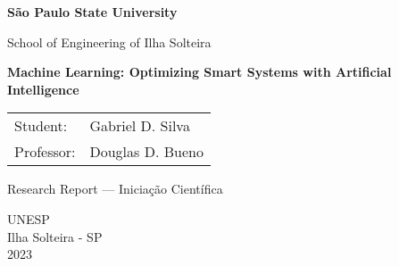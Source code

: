 \begin{titlepage}
    
\sffamily
\centering
{\Large\bfseries São Paulo State University}

{\Large School of Engineering of Ilha Solteira}

\vfill

{\LARGE\bfseries Machine Learning: Optimizing Smart Systems with Artificial Intelligence}

\vfill

\begin{tabular}{ll}
    Student:        & Gabriel D. Silva \\
    Professor:      & Douglas D. Bueno
\end{tabular}

\vfill

Research Report --- Iniciação Científica 

\vfill

UNESP \\
Ilha Solteira - SP \\
2023
\end{titlepage}


     
     
     
     
     
     
     
      
      
      
     
     
     
     
